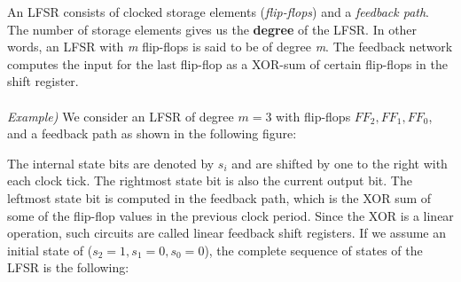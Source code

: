 \documentclass[11pt, a4paper]{article}
\begin{document}
An LFSR consists of clocked storage elements (\textit{flip-flops}) and a \textit{feedback path}. The number of storage elements gives us the \textbf{degree} of the LFSR. In other words, an LFSR with \textit{m} flip-flops is said to be of degree \textit{m}. The feedback network computes the input for the last flip-flop as a XOR-sum of certain flip-flops in the shift register.\\\\
\textit{Example)} We consider an LFSR of degree $m=3$ with flip-flops $FF_2,FF_1,FF_0$, and a feedback path as shown in the following figure:
\begin{center}
\end{center}
The internal state bits are denoted by $s_i$ and are shifted by one to the right with each clock tick. The rightmost state bit is also the current output bit. The leftmost state bit is computed in the feedback path, which is the XOR sum of some of the flip-flop values in the previous clock period. Since the XOR is a linear operation, such circuits are called linear feedback shift registers. If we assume an initial state of ($s_2=1, s_1=0, s_0=0$), the complete sequence of states of the LFSR is the following:
\end{document}
